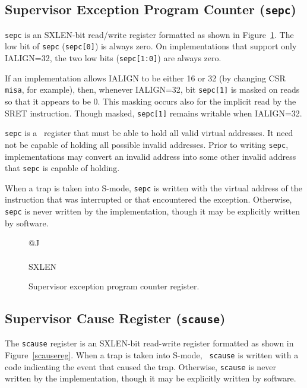 \subsection{Supervisor Exception Program Counter ({\tt sepc})}

{\tt sepc} is an SXLEN-bit read/write register formatted as shown in
Figure~\ref{epcreg}.  The low bit of {\tt sepc} ({\tt sepc[0]}) is
always zero.  On implementations that support only IALIGN=32, the two low bits
({\tt sepc[1:0]}) are always zero.

If an implementation allows IALIGN to be either 16 or 32 (by
changing CSR {\tt misa}, for example), then, whenever IALIGN=32, bit
{\tt sepc[1]} is masked on reads so that it appears to be 0.  This
masking occurs also for the implicit read by the SRET instruction.
Though masked, {\tt sepc[1]} remains writable when IALIGN=32.

{\tt sepc} is a \warl\ register that must be able to hold all valid
virtual addresses.  It need not be capable of holding all possible invalid
addresses.
Prior to writing {\tt sepc}, implementations may convert an invalid address
into some other invalid address that {\tt sepc} is capable of holding.

When a trap is taken into S-mode, {\tt sepc} is written with the
virtual address of the instruction that was interrupted or that
encountered the exception.  Otherwise, {\tt sepc} is never written by
the implementation, though it may be explicitly written by software.

\begin{figure}[h!]
{\footnotesize
\begin{center}
\begin{tabular}{@{}J}
 \\
\hline
{} \\
\hline
SXLEN \\
\end{tabular}
\end{center}
}
\vspace{-0.1in}
\caption{Supervisor exception program counter register.}
\label{epcreg}
\end{figure}

\subsection{Supervisor Cause Register ({\tt scause})}
\label{sec:scause}

The {\tt scause} register is an SXLEN-bit read-write register formatted as
shown in Figure~\ref{scausereg}.  When a trap is taken into S-mode, {\tt
scause} is written with a code indicating the event that caused the trap.
Otherwise, {\tt scause} is never written by the implementation, though it may be
explicitly written by software.

